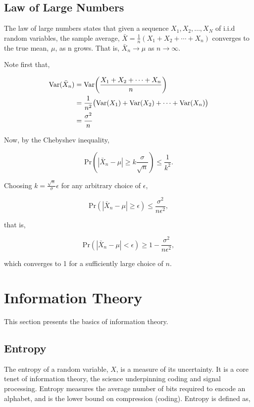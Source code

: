 \documentclass[11pt]{amsart}
\begin{document}
\subsection{Law of Large Numbers}

The law of large numbers states that given a sequence $X_1, X_2, \dots, X_N$ of i.i.d random variables, the sample average, $\bar{X} = \frac{1}{n}(X_1 + X_2 + \cdots + X_n)$ converges to the true mean, $\mu$, as n grows. That is, $\bar{X}_n \rightarrow \mu$ as $n \rightarrow \infty$.

Note first that,

\begin{align}
\text{Var}(\bar{X}_n) &= \text{Var}\bigg(\frac{X_1 + X_2 + \cdots + X_n}{n}\bigg) \notag \\
&= \frac{1}{n^2}\big(\text{Var}(X_1) + \text{Var}(X_2) + \cdots + \text{Var}(X_n)\big) \notag \\
&= \frac{\sigma^2}{n} \notag
\end{align}

Now, by the Chebyshev inequality,

$$
\text{Pr}(|\bar{X}_n - \mu| \geq k\frac{\sigma}{\sqrt{n}}) \leq \frac{1}{k^2}.
$$

Choosing $k = \frac{\sqrt{n}}{\sigma}\epsilon$ for any arbitrary choice of $\epsilon$,

$$
\text{Pr}(|\bar{X}_n - \mu| \geq \epsilon) \leq \frac{\sigma^2}{n\epsilon^2},
$$

that is,

$$
\text{Pr}(|\bar{X}_n - \mu| < \epsilon) \geq 1 - \frac{\sigma^2}{n\epsilon^2},
$$

which converges to 1 for a sufficiently large choice of $n$.

\section{Information Theory}

This section presents the basics of information theory.

\subsection{Entropy}

The entropy of a random variable, $X$, is a measure of its uncertainty. It is a core tenet of information theory, the science underpinning coding and signal processing. Entropy measures the average number of bits required to encode an alphabet, and is the lower bound on compression (coding). Entropy is defined as,
\end{document}
